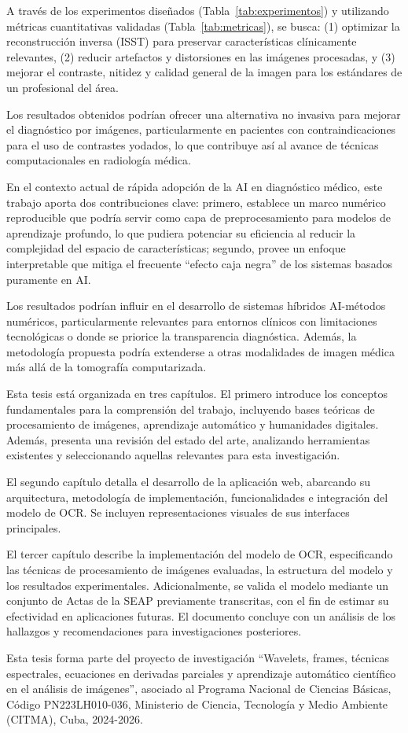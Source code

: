 A través de los experimentos diseñados (Tabla~\ref{tab:experimentos}) y utilizando métricas cuantitativas validadas (Tabla~\ref{tab:metricas}), se busca: (1) optimizar la reconstrucción inversa (ISST) para preservar características clínicamente relevantes, (2) reducir artefactos y distorsiones en las imágenes procesadas, y (3) mejorar el contraste, nitidez y calidad general de la imagen para los estándares de un profesional del área.

Los resultados obtenidos podrían ofrecer una alternativa no invasiva para mejorar el diagnóstico por imágenes, particularmente en pacientes con contraindicaciones para el uso de contrastes yodados, lo que contribuye así al avance de técnicas computacionales en radiología médica.

En el contexto actual de rápida adopción de la AI en diagnóstico médico, este trabajo aporta dos contribuciones clave: primero, establece un marco numérico reproducible que podría servir como capa de preprocesamiento para modelos de aprendizaje profundo, lo que pudiera potenciar su eficiencia al reducir la complejidad del espacio de características; segundo, provee un enfoque interpretable que mitiga el frecuente ``efecto caja negra'' de los sistemas basados puramente en AI.

Los resultados podrían influir en el desarrollo de sistemas híbridos AI-métodos numéricos, particularmente relevantes para entornos clínicos con limitaciones tecnológicas o donde se priorice la transparencia diagnóstica. Además, la metodología propuesta podría extenderse a otras modalidades de imagen médica más allá de la tomografía computarizada.

Esta tesis está organizada en tres capítulos. El primero introduce los conceptos fundamentales para la comprensión del trabajo, incluyendo bases teóricas de procesamiento de imágenes, aprendizaje automático y humanidades digitales. Además, presenta una revisión del estado del arte, analizando herramientas existentes y seleccionando aquellas relevantes para esta investigación.

El segundo capítulo detalla el desarrollo de la aplicación web, abarcando su arquitectura, metodología de implementación, funcionalidades e integración del modelo de OCR. Se incluyen representaciones visuales de sus interfaces principales.

El tercer capítulo describe la implementación del modelo de OCR, especificando las técnicas de procesamiento de imágenes evaluadas, la estructura del modelo y los resultados experimentales. Adicionalmente, se valida el modelo mediante un conjunto de Actas de la SEAP previamente transcritas, con el fin de estimar su efectividad en aplicaciones futuras. El documento concluye con un análisis de los hallazgos y recomendaciones para investigaciones posteriores.

Esta tesis forma parte del proyecto de investigación ``Wavelets, frames, técnicas espectrales, ecuaciones en derivadas parciales y aprendizaje automático científico en el análisis de imágenes'', asociado al Programa Nacional de Ciencias Básicas, Código PN223LH010-036, Ministerio de Ciencia, Tecnología y Medio Ambiente (CITMA), Cuba, 2024-2026.
